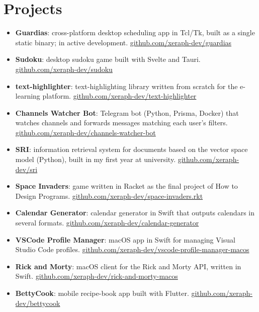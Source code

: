 \documentclass[10pt,a4paper]{article}
\begin{document}
\section*{Projects}
\begin{itemize}
  \item \textbf{Guardias}: cross-platform desktop scheduling app in Tcl/Tk, built as a single static binary; in active development. \href{https://github.com/xeraph-dev/guardias}{github.com/xeraph-dev/guardias}
  \item \textbf{Sudoku}: desktop sudoku game built with Svelte and Tauri. \href{https://github.com/xeraph-dev/sudoku}{github.com/xeraph-dev/sudoku}
  \item \textbf{text-highlighter}: text-highlighting library written from scratch for the e-learning platform. \href{https://github.com/xeraph-dev/text-highlighter}{github.com/xeraph-dev/text-highlighter}
  \item \textbf{Channels Watcher Bot}: Telegram bot (Python, Prisma, Docker) that watches channels and forwards messages matching each user's filters. \href{https://github.com/xeraph-dev/channels-watcher-bot}{github.com/xeraph-dev/channels-watcher-bot}
  \item \textbf{SRI}: information retrieval system for documents based on the vector space model (Python), built in my first year at university. \href{https://github.com/xeraph-dev/sri}{github.com/xeraph-dev/sri}
  \item \textbf{Space Invaders}: game written in Racket as the final project of How to Design Programs. \href{https://github.com/xeraph-dev/space-invaders.rkt}{github.com/xeraph-dev/space-invaders.rkt}
  \item \textbf{Calendar Generator}: calendar generator in Swift that outputs calendars in several formats. \href{https://github.com/xeraph-dev/calendar-generator}{github.com/xeraph-dev/calendar-generator}
  \item \textbf{VSCode Profile Manager}: macOS app in Swift for managing Visual Studio Code profiles. \href{https://github.com/xeraph-dev/vscode-profile-manager-macos}{github.com/xeraph-dev/vscode-profile-manager-macos}
  \item \textbf{Rick and Morty}: macOS client for the Rick and Morty API, written in Swift. \href{https://github.com/xeraph-dev/rick-and-morty-macos}{github.com/xeraph-dev/rick-and-morty-macos}
  \item \textbf{BettyCook}: mobile recipe-book app built with Flutter. \href{https://github.com/xeraph-dev/bettycook}{github.com/xeraph-dev/bettycook}
\end{itemize}
\end{document}
